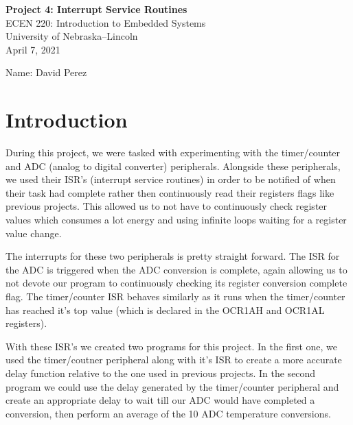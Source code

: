 \documentclass[11pt,pdftex,portrait,letterpaper]{article}
\begin{document}
	
	\vspace*{30ex}
	\begin{center}
		
		\textbf{Project 4: Interrupt Service Routines}\\
		
		\vspace{4ex}
		ECEN 220: Introduction to Embedded Systems\\
		University of Nebraska--Lincoln\\
		April 7, 2021
		
		\vspace{4ex}
		Name: David Perez\\
		
	\end{center}
	
	
	\pagebreak
	\tableofcontents
	\pagebreak
	
	
	\section{Introduction}
	
	During this project, we were tasked with experimenting with the timer/counter and ADC (analog to digital converter) peripherals. Alongside these peripherals, we used their ISR's (interrupt service routines) in order to be notified of when their task had complete rather then continuously read their registers flags like previous projects. This allowed us to not have to continuously check register values which consumes a lot energy and using infinite loops waiting for a register value change. 
	
	The interrupts for these two peripherals is pretty straight forward. The ISR for the ADC is triggered when the ADC conversion is complete, again allowing us to not devote our program to continuously checking its register conversion complete flag. The timer/counter ISR behaves similarly as it runs when the timer/counter has reached it's top value (which is declared in the OCR1AH and OCR1AL registers).
	
	With these ISR's we created two programs for this project. In the first one, we used the timer/coutner peripheral along with it's ISR to create a more accurate delay function relative to the one used in previous projects. In the second program we could use the delay generated by the timer/counter peripheral and create an appropriate delay to wait till our ADC would have completed a conversion, then perform an average of the 10 ADC temperature conversions. 
	
\end{document}
